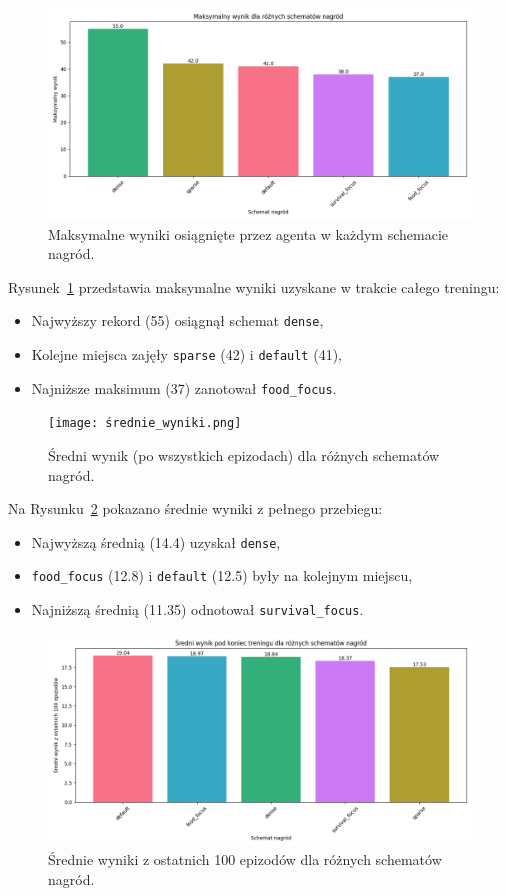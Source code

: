 \documentclass[a4paper,12pt]{article}
\begin{document}
\begin{figure}[H] 
  \centering
  \includegraphics[width=0.85\linewidth]{maksymalne_wyniki.png}
  \caption{Maksymalne wyniki osiągnięte przez agenta w każdym schemacie nagród.}
  \label{fig:reward_max}
\end{figure}

Rysunek~\ref{fig:reward_max} przedstawia maksymalne wyniki uzyskane w trakcie całego treningu:
\begin{itemize}
  \item Najwyższy rekord (55) osiągnął schemat \texttt{dense},
  \item Kolejne miejsca zajęły \texttt{sparse} (42) i \texttt{default} (41),
  \item Najniższe maksimum (37) zanotował \texttt{food\_focus}.
\end{itemize}

\begin{figure}[H] 
  \centering
  \texttt{[image: średnie\_wyniki.png]}
  \caption{Średni wynik (po wszystkich epizodach) dla różnych schematów nagród.}
  \label{fig:reward_mean}
\end{figure}

Na Rysunku~\ref{fig:reward_mean} pokazano średnie wyniki z pełnego przebiegu:
\begin{itemize}
  \item Najwyższą średnią (14.4) uzyskał \texttt{dense},
  \item \texttt{food\_focus} (12.8) i \texttt{default} (12.5) były na kolejnym miejscu,
  \item Najniższą średnią (11.35) odnotował \texttt{survival\_focus}.
\end{itemize}

\begin{figure}[h!] 
  \centering
  \includegraphics[width=0.85\linewidth]{końcowe_średnie.png}
  \caption{Średnie wyniki z ostatnich 100 epizodów dla różnych schematów nagród.}
  \label{fig:reward_final}
\end{figure}
\end{document}
